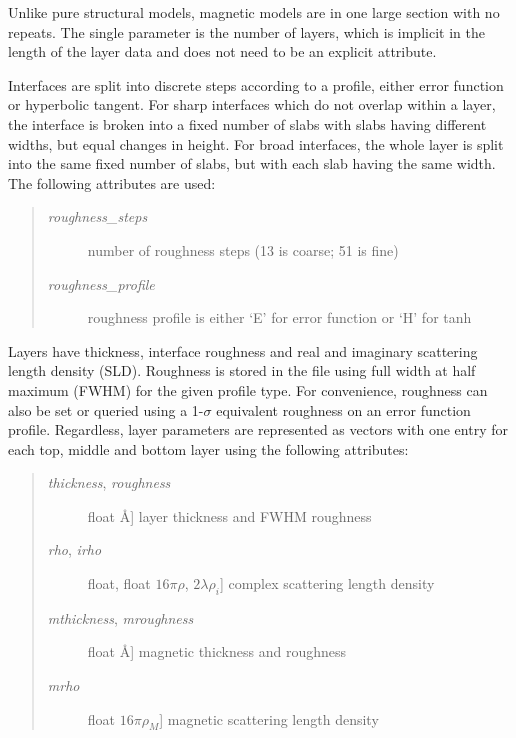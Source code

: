 \documentclass[letterpaper,10pt,english]{sphinxmanual}
\begin{document}
\begin{fulllineitems}
Unlike pure structural models, magnetic models are in one large
section with no repeats.  The single parameter is the number of
layers, which is implicit in the length of the layer data and
does not need to be an explicit attribute.

Interfaces are split into discrete steps according to a profile,
either error function or hyperbolic tangent.  For sharp interfaces
which do not overlap within a layer, the interface is broken into a
fixed number of slabs with slabs having different widths, but equal
changes in height.  For broad interfaces, the whole layer is split
into the same fixed number of slabs, but with each slab having the
same width. The following attributes are used:
\begin{quote}
\begin{description}
\item[{\emph{roughness\_steps}}] \leavevmode
number of roughness steps (13 is coarse; 51 is fine)

\item[{\emph{roughness\_profile}}] \leavevmode
roughness profile is either `E' for error function or `H' for tanh

\end{description}
\end{quote}

Layers have thickness, interface roughness and real and imaginary
scattering length density (SLD).  Roughness is stored in the file
using full width at half maximum (FWHM) for the given profile type.
For convenience, roughness can also be set or queried using a 1-$\sigma$
equivalent roughness on an error function profile.  Regardless,
layer parameters are represented as vectors with one entry for each
top, middle and bottom layer using the following attributes:
\begin{quote}
\begin{description}
\item[{\emph{thickness}, \emph{roughness}}] \leavevmode{[}float \textbar{} Å{]}
layer thickness and FWHM roughness

\item[{\emph{rho}, \emph{irho}}] \leavevmode{[}float, float \textbar{} $16 \pi \rho$, $2\lambda\rho_i${]}
complex scattering length density

\item[{\emph{mthickness}, \emph{mroughness}}] \leavevmode{[}float \textbar{} Å{]}
magnetic thickness and roughness

\item[{\emph{mrho}}] \leavevmode{[}float \textbar{} $16 \pi \rho_M${]}
magnetic scattering length density


\end{description}
\end{quote}
\end{fulllineitems}
\end{document}
